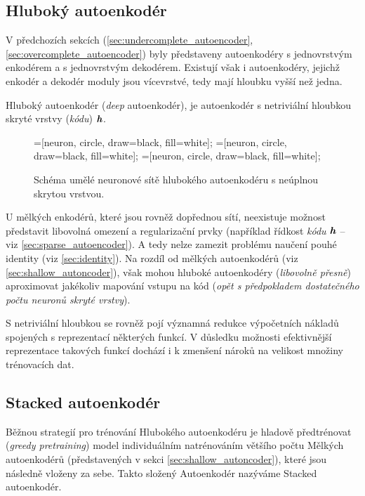 \subsection{Hluboký autoenkodér}
\label{sec:deep_ae}
V předchozích sekcích (\autoref{sec:undercomplete_autoencoder}, \autoref{sec:overcomplete_autoencoder}) byly představeny autoenkodéry s jednovrstvým enkodérem a s jednovrstvým dekodérem.
Existují však i autoenkodéry, jejichž enkodér a dekodér moduly jsou vícevrstvé, tedy mají hloubku vyšší než jedna.

Hluboký autoenkodér (\emph{deep} autoenkodér), je autoenkodér s netriviální hloubkou skryté vrstvy (\emph{kódu}) $\textbf{\emph{h}}$. \cite{Geron2019}

\begin{figure}[H]
    \centering
    \begin{neuralnetwork}[height=6]
        =[neuron, circle, draw=black, fill=white];
        =[neuron, circle, draw=black, fill=white];
        =[neuron, circle, draw=black, fill=white];
      
        \hiddenlayer[count=4, bias=false]
        \linklayers
        \hiddenlayer[count=2, bias=false]
        \linklayers
        \hiddenlayer[count=4, bias=false]
        \linklayers
        \outputlayer[count=6, text=\xout]
        \linklayers
      \end{neuralnetwork}
    \caption{Schéma umělé neuronové sítě hlubokého autoenkodéru s neúplnou skrytou vrstvou.}
    \label{fig:stacked_autoencoder}
\end{figure}

U mělkých enkodérů, které jsou rovněž dopřednou sítí, neexistuje možnost představit libovolná omezení a regularizační prvky (například řídkost \emph{kódu} $\textbf{\emph{h}}$ – viz \autoref{sec:sparse_autoencoder}).
A tedy nelze zamezit problému naučení pouhé identity (viz \autoref{sec:identity}). Na rozdíl od mělkých autoenkodérů (viz \autoref{sec:shallow_autoncoder}),
však mohou hluboké autoenkodéry (\emph{libovolně přesně}) aproximovat jakékoliv mapování vstupu na kód (\emph{opět s předpokladem dostatečného počtu neuronů skryté vrstvy}). \cite{Goodfellow2016, Charte2018}

S netriviální hloubkou se rovněž pojí významná redukce výpočetních nákladů spojených s reprezentací některých funkcí. 
V důsledku možnosti efektivnější reprezentace takových funkcí dochází i k zmenšení nároků na velikost množiny trénovacích dat.

\subsection{Stacked autoenkodér}
\label{sec:stacked_autoencoder}
Běžnou strategií pro trénování Hlubokého autoenkodéru je hladově předtrénovat (\emph{greedy pretraining}) model individuálním natrénováním většího počtu Mělkých autoenkodérů (představených v sekci \autoref{sec:shallow_autoncoder}), které jsou následně vloženy za sebe.
Takto složený Autoenkodér nazýváme Stacked autoenkodér. \cite{Geron2019}